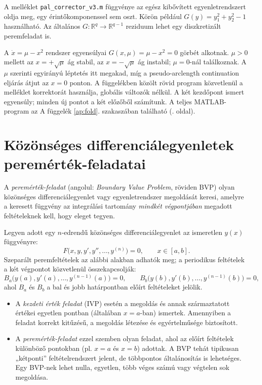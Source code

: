 A melléklet \texttt{pal\_corrector\_v3.m} függvénye az egész kibővített egyenletrendszert oldja meg, egy érintőkomponenssel sem oszt. Körön például $G(y)=y_1^2+y_2^2-1$ használható. Az általános $G:\mathbb R^q\to\mathbb R^{q-1}$ reziduum lehet egy diszkretizált peremfeladat is.

\FloatBarrier
{}
A $\dot x=\mu-x^2$ rendszer egyensúlyai $G(x,\mu)=\mu-x^2=0$ görbét alkotnak. $\mu>0$ mellett az $x=+\sqrt\mu$ ág stabil, az $x=-\sqrt\mu$ ág instabil; $\mu=0$-nál találkoznak. A $\mu$ szerinti egyirányú léptetés itt megakad, míg a pseudo-arclength continuation eljárás átjut az $x=0$ ponton. A függelékben közölt rövid program közvetlenül a melléklet korrektorát használja, globális változók nélkül. A két kezdőpont ismert egyensúly; minden új pontot a két előzőből számítunk.
\label{use:fold}A teljes MATLAB-program az A függelék \ref{ap:fold}. szakaszában található (\pageref{ap:fold}. oldal).
\exampleend

\section{Közönséges differenciálegyenletek peremérték-feladatai}

A \emph{peremérték-feladat} (angolul: \emph{Boundary Value Problem}, röviden BVP) olyan közönséges differenciálegyenlet vagy egyenletrendszer megoldását keresi, amelyre a keresett függvény az integrálási tartomány \emph{mindkét végpontjában} megadott feltételeknek kell, hogy eleget tegyen.

Legyen adott egy $n$-edrendű közönséges differenciálegyenlet az ismeretlen $y(x)$ függvényre:
\[
F\big(x, y, y', y'', \ldots, y^{(n)}\big) = 0,
\qquad x \in [a,b].
\]
Szeparált peremfeltételek az alábbi alakban adhatók meg; a periodikus feltételek a két végpontot közvetlenül összekapcsolják:
\[
B_a\big(y(a), y'(a), \ldots, y^{(n-1)}(a)\big) = 0,
\qquad
B_b\big(y(b), y'(b), \ldots, y^{(n-1)}(b)\big) = 0,
\]
ahol $B_a$ és $B_b$ a bal és jobb határpontban előírt feltételeket jelölik.

\begin{itemize}
\item A \emph{kezdeti érték feladat} (IVP) esetén a megoldás és annak származtatott értékei egyetlen pontban (általában $x=a$-ban) ismertek. Amennyiben a feladat korrekt kitűzésű, a megoldás létezése és egyértelműsége biztosított.
\item A \emph{peremérték-feladat} ezzel szemben olyan feladat, ahol az előírt feltételek különböző pontokban (pl. $x=a$ és $x=b$) adottak. A BVP tehát tipikusan „kétponti” feltételrendszert jelent, de többpontos általánosítás is lehetséges. Egy BVP-nek lehet nulla, egyetlen, több véges számú vagy végtelen sok megoldása.
\end{itemize}


